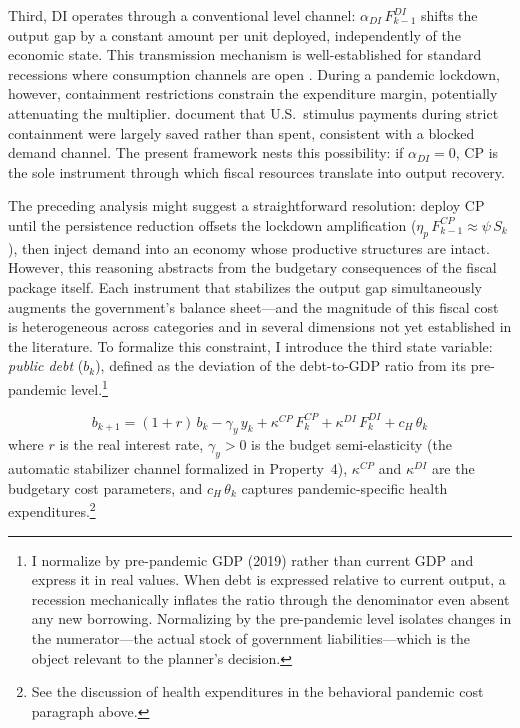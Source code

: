 \documentclass[12pt, a4paper]{article}
\begin{document}
Third, DI operates through a conventional level channel: $\alpha_{\textit{DI}}\, F^{DI}_{k-1}$ shifts the output gap by a constant amount per unit deployed, independently of the economic state. This transmission mechanism is well-established for standard recessions where consumption channels are open \citep{ramey2018, blanchard2002}. During a pandemic lockdown, however, containment restrictions constrain the expenditure margin, potentially attenuating the multiplier. \citet{chetty2020} document that U.S.\ stimulus payments during strict containment were largely saved rather than spent, consistent with a blocked demand channel. The present framework nests this possibility: if $\alpha_{\textit{DI}} = 0$, CP is the sole instrument through which fiscal resources translate into output recovery.

The preceding analysis might suggest a straightforward resolution: deploy CP until the persistence reduction offsets the lockdown amplification ($\eta_p\, F^{CP}_{k-1} \approx \psi\, S_k$), then inject demand into an economy whose productive structures are intact. However, this reasoning abstracts from the budgetary consequences of the fiscal package itself. Each instrument that stabilizes the output gap simultaneously augments the government's balance sheet---and the magnitude of this fiscal cost is heterogeneous across categories and in several dimensions not yet established in the literature. To formalize this constraint, I introduce the third state variable: \textit{public debt} ($b_k$), defined as the deviation of the debt-to-GDP ratio from its pre-pandemic level.\footnote{I normalize by pre-pandemic GDP (2019) rather than current GDP and express it in real values. When debt is expressed relative to current output, a recession mechanically inflates the ratio through the denominator even absent any new borrowing. Normalizing by the pre-pandemic level isolates changes in the numerator---the actual stock of government liabilities---which is the object relevant to the planner's decision.}

%
\begin{equation}
    b_{k+1} = (1+r)\, b_k - \gamma_y\, y_k + \kappa^{CP}\, F^{CP}_k + \kappa^{DI}\, F^{DI}_k + c_H\, \theta_k
    \label{eq:debt}
\end{equation}
%
where $r$ is the real interest rate, $\gamma_y > 0$ is the budget semi-elasticity (the automatic stabilizer channel formalized in Property~4), $\kappa^{CP}$ and $\kappa^{DI}$ are the budgetary cost parameters, and $c_H\, \theta_k$ captures pandemic-specific health expenditures.\footnote{See the discussion of health expenditures in the behavioral pandemic cost paragraph above.}
\end{document}
